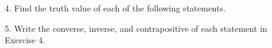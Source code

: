\documentclass{article}
\begin{document}
\begin{itemize}
    (d) If Joyce is smiling, then she is happy.\\
    Converse: {\color{blue} If she is happy, then Joyce is smiling.}\\
    Inverse: {\color{olive} If Joyce isn't smiling, then she isn't happy}\\
    Contrapositive: {\color{purple} If she isn't happy, then Joyce isn't smiling.}
    
    \item[4.] Find the truth value of each of the following statements.
    
    \item[5.] Write the converse, inverse, and contrapositive of each statement in Exercise 4.

\end{itemize}
\end{document}
